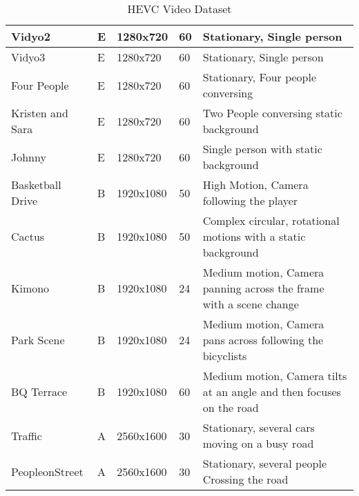\documentclass{book}
\begin{document}
\begin{table}[h!]
{\begin{tabular}{|l|l|l|l|l|}
			Vidyo2           & E & 1280x720  & 60 & Stationary, Single person                                          \\ \hline
			Vidyo3           & E & 1280x720  & 60 & Stationary, Single person                                          \\ \hline
			Four People      & E & 1280x720  & 60 & Stationary, Four people conversing                                 \\ \hline
			Kristen and Sara & E & 1280x720  & 60 & Two People conversing static background                            \\ \hline
			Johnny           & E & 1280x720  & 60 & Single person with static background                               \\ \hline
			Basketball Drive & B & 1920x1080 & 50 & High Motion, Camera following the player                           \\ \hline
			Cactus           & B & 1920x1080 & 50 & Complex circular, rotational motions with a static background      \\ \hline
			Kimono           & B & 1920x1080 & 24 & Medium motion, Camera panning across the frame with a scene change \\ \hline
			Park Scene       & B & 1920x1080 & 24 & Medium motion, Camera pans across following the bicyclists         \\ \hline
			BQ Terrace &
			B &
			1920x1080 &
			60 &
			Medium motion, Camera tilts at an angle and then focuses on the road \\ \hline
			Traffic          & A & 2560x1600 & 30 & Stationary, several cars moving on a busy road                     \\ \hline
			PeopleonStreet   & A & 2560x1600 & 30 & Stationary, several people Crossing the road                       \\ \hline
		\end{tabular}%
	
	}\caption{HEVC Video Dataset} \cite{HEVCTestvideo}
\end{table}
\end{document}
